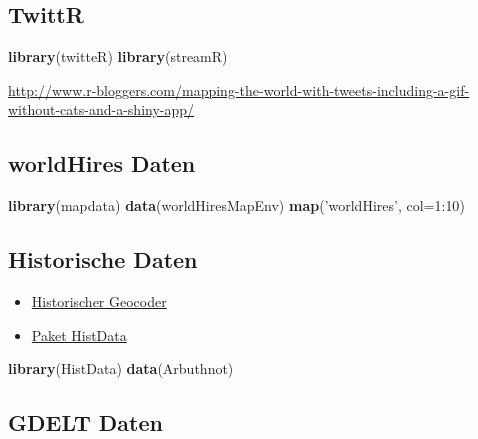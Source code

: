 \documentclass[]{article}
\newenvironment{Shaded}{\begin{snugshade}}{\end{snugshade}}
\newcommand{\KeywordTok}[1]{\textcolor[rgb]{0.13,0.29,0.53}{\textbf{{#1}}}}
\newcommand{\DataTypeTok}[1]{\textcolor[rgb]{0.13,0.29,0.53}{{#1}}}
\newcommand{\DecValTok}[1]{\textcolor[rgb]{0.00,0.00,0.81}{{#1}}}
\newcommand{\StringTok}[1]{\textcolor[rgb]{0.31,0.60,0.02}{{#1}}}
\newcommand{\NormalTok}[1]{{#1}}
\begin{document}
\subsection{TwittR}\label{twittr}

\begin{Shaded}
\begin{Highlighting}[]
\KeywordTok{library}\NormalTok{(twitteR)}
\KeywordTok{library}\NormalTok{(streamR)}
\end{Highlighting}
\end{Shaded}

\url{http://www.r-bloggers.com/mapping-the-world-with-tweets-including-a-gif-without-cats-and-a-shiny-app/}

\subsection{worldHires Daten}\label{worldhires-daten}

\begin{Shaded}
\begin{Highlighting}[]
\KeywordTok{library}\NormalTok{(mapdata)}
\KeywordTok{data}\NormalTok{(worldHiresMapEnv)}
\KeywordTok{map}\NormalTok{(}\StringTok{'worldHires'}\NormalTok{, }\DataTypeTok{col=}\DecValTok{1}\NormalTok{:}\DecValTok{10}\NormalTok{)}
\end{Highlighting}
\end{Shaded}

\subsection{Historische Daten}\label{historische-daten}

\begin{itemize}
\item
  \href{http://www.azavea.com/blogs/newsletter/v2i3/azavea-research-historic-geocoder/}{Historischer
  Geocoder}
\item
  \href{http://www.inside-r.org/packages/cran/HistData}{Paket HistData}
\end{itemize}

\begin{Shaded}
\begin{Highlighting}[]
\KeywordTok{library}\NormalTok{(HistData)}
\KeywordTok{data}\NormalTok{(Arbuthnot)}
\end{Highlighting}
\end{Shaded}

\subsection{GDELT Daten}\label{gdelt-daten}
\end{document}
